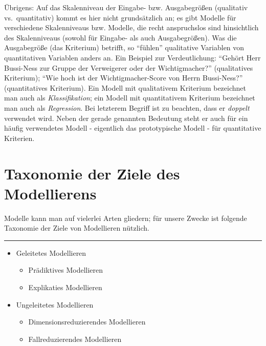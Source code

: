\documentclass[12pt,ngerman,]{book}
\providecommand{\tightlist}{%
  \setlength{\itemsep}{0pt}\setlength{\parskip}{0pt}}
\begin{document}
Übrigens: Auf das Skalenniveau der Eingabe- bzw. Ausgabegrößen
(qualitativ vs.~quantitativ) kommt es hier nicht grundsätzlich an; es
gibt Modelle für verschiedene Skalenniveaus bzw. Modelle, die recht
anspruchslos sind hinsichtlich des Skalenniveaus (sowohl für Eingabe-
als auch Ausgabegrößen). Was die Ausgabegröße (das Kriterium) betrifft,
so ``fühlen'' qualitative Variablen von quantitativen Variablen anders
an. Ein Beispiel zur Verdeutlichung: ``Gehört Herr Bussi-Ness zur Gruppe
der Verweigerer oder der Wichtigmacher?'' (qualitatives Kriterium);
``Wie hoch ist der Wichtigmacher-Score von Herrn Bussi-Ness?''
(quantitatives Kriterium). Ein Modell mit qualitativem Kriterium
bezeichnet man auch als \emph{Klassifikation}; ein
Modell mit quantitativem Kriterium bezeichnet man auch als
\emph{Regression}. Bei letzterem Begriff ist zu
beachten, dass er \emph{doppelt} verwendet wird. Neben der gerade
genannten Bedeutung steht er auch für ein häufig verwendetes Modell -
eigentlich das prototypische Modell - für quantitative Kriterien.

\section{Taxonomie der Ziele des Modellierens}\label{Ziele}

Modelle kann man auf vielerlei Arten gliedern; für unsere Zwecke ist
folgende Taxonomie der Ziele von Modellieren nützlich.

\begin{center}\rule{0.5\linewidth}{\linethickness}\end{center}

\begin{itemize}
\tightlist
\item
  Geleitetes Modellieren

  \begin{itemize}
  \tightlist
  \item
    Prädiktives Modellieren
  \item
    Explikaties Modellieren
  \end{itemize}
\item
  Ungeleitetes Modellieren

  \begin{itemize}
  \tightlist
  \item
    Dimensionsreduzierendes Modellieren
  \item
    Fallreduzierendes Modellieren
  \end{itemize}
\end{itemize}
\end{document}
